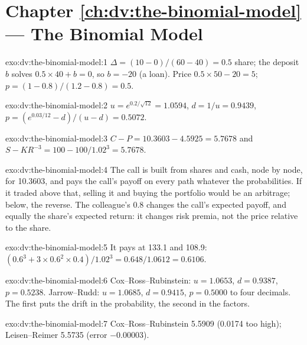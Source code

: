 \section*{Chapter \ref{ch:dv:the-binomial-model} --- The Binomial Model}

\begin{solution}{exo:dv:the-binomial-model:1}
$\Delta=(10-0)/(60-40)=0.5$ share; the deposit $b$ solves $0.5\times40+b=0$, so
$b=-20$ (a loan). Price $0.5\times50-20=5$; $p=(1-0.8)/(1.2-0.8)=0.5$.
\end{solution}

\begin{solution}{exo:dv:the-binomial-model:2}
$u=e^{0.2/\sqrt{12}}=1.0594$, $d=1/u=0.9439$,
$p=(e^{0.03/12}-d)/(u-d)=0.5072$.
\end{solution}

\begin{solution}{exo:dv:the-binomial-model:3}
$C-P=10.3603-4.5925=5.7678$ and $S-KR^{-3}=100-100/1.02^3=5.7678$.
\end{solution}

\begin{solution}{exo:dv:the-binomial-model:4}
The call is built from shares and cash, node by node, for 10.3603, and pays the
call's payoff on every path whatever the probabilities. If it traded above that,
selling it and buying the portfolio would be an arbitrage; below, the reverse.
The colleague's 0.8 changes the call's expected payoff, and equally the share's
expected return: it changes risk premia, not the price relative to the share.
\end{solution}

\begin{solution}{exo:dv:the-binomial-model:5}
It pays at 133.1 and 108.9: $(0.6^3+3\times0.6^2\times0.4)/1.02^3=0.648/1.0612=0.6106$.
\end{solution}

\begin{solution}{exo:dv:the-binomial-model:6}
Cox--Ross--Rubinstein: $u=1.0653$, $d=0.9387$, $p=0.5238$. Jarrow--Rudd:
$u=1.0685$, $d=0.9415$, $p=0.5000$ to four decimals. The first puts the drift in
the probability, the second in the factors.
\end{solution}

\begin{solution}{exo:dv:the-binomial-model:7}
Cox--Ross--Rubinstein 5.5909 (0.0174 too high); Leisen--Reimer 5.5735 (error
$-0.00003$).
\end{solution}

